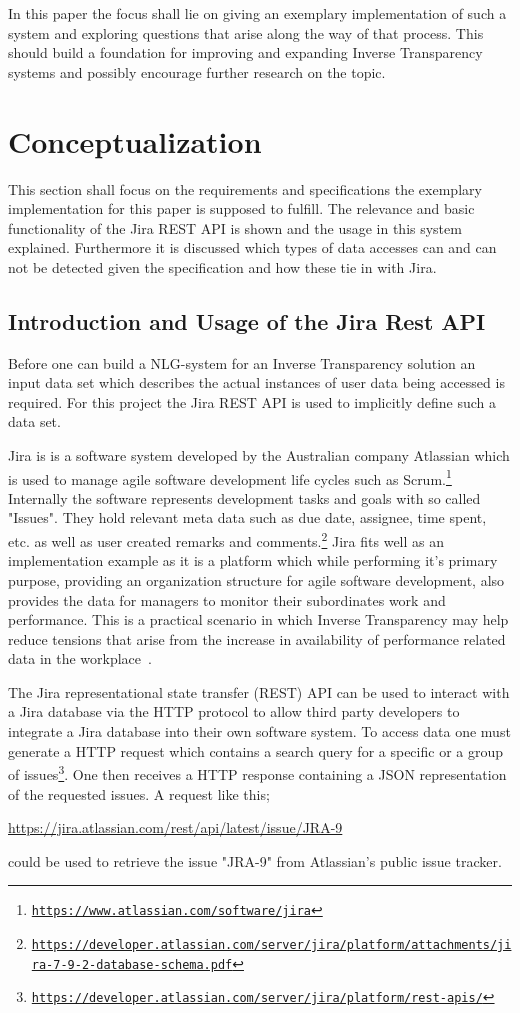 \documentclass[sigconf,obeyspaces]{acmart}
\begin{document}
In this paper the focus shall lie on giving an exemplary implementation of such a system and exploring questions that arise along the way of that process. This should build a foundation for improving and expanding Inverse Transparency systems and possibly encourage further research on the topic.


\section{Conceptualization} \label{concept}
This section shall focus on the requirements and specifications the exemplary implementation for this paper is supposed to fulfill. The relevance and basic functionality of the Jira REST API is shown and the usage in this system explained. Furthermore it is discussed which types of data accesses can and can not be detected given the specification and how these tie in with Jira.

\subsection{Introduction and Usage of the Jira Rest API} \label{jira}
Before one can build a NLG-system for an Inverse Transparency solution an input data set which describes the actual instances of user data being accessed is required. For this project the Jira REST API is used to implicitly define such a data set.

Jira is is a software system developed by the Australian company Atlassian which is used to manage agile software development life cycles such as Scrum.\footnote{\texttt{\url{https://www.atlassian.com/software/jira}}} Internally the software represents development tasks and goals with so called "Issues". They hold relevant meta data such as due date, assignee, time spent, etc. as well as user created remarks and comments.\footnote{\texttt{\url{https://developer.atlassian.com/server/jira/platform/attachments/jira-7-9-2-database-schema.pdf}}} Jira fits well as an implementation example as it is a platform which while performing it's primary purpose, providing an organization structure for agile software development, also provides the data for managers to monitor their subordinates work and performance. This is a practical scenario in which Inverse Transparency may help reduce tensions that arise from the increase in availability of performance related data in the workplace~\cite[10\psqq]{gierlich_jonas}.

The Jira representational state transfer (REST) API can be used to interact with a Jira database via the HTTP protocol to allow third party developers to integrate a Jira database into their own software system. To access data one must generate a HTTP request which contains a search query for a specific or a group of issues\footnote{\texttt{\url{https://developer.atlassian.com/server/jira/platform/rest-apis/}}}. One then receives a HTTP response containing a JSON representation of the requested issues. A request like this; 
\begin{center}
    \url{https://jira.atlassian.com/rest/api/latest/issue/JRA-9}
\end{center}
could be used to retrieve the issue "JRA-9" from Atlassian's public issue tracker.
\end{document}
